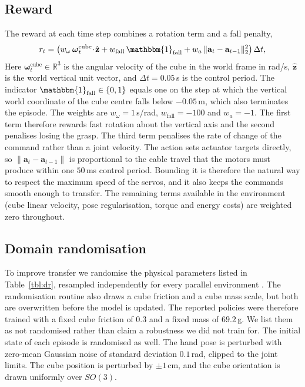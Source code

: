 \documentclass[11pt]{article}
\begin{document}
\subsection{Reward}
The reward at each time step combines a rotation term and a fall penalty,
\begin{equation}
  r_t = \bigl( w_{\omega}\, \boldsymbol{\omega}_t^{\mathrm{cube}} \!\cdot\! \hat{\mathbf{z}}
      + w_{\mathrm{fall}}\, \mathbbm{1}_{\mathrm{fall}}
      + w_{a}\, \lVert \mathbf{a}_t - \mathbf{a}_{t-1} \rVert_2^2 \bigr)\, \Delta t,
  \label{eq:reward}
\end{equation}
Here $\boldsymbol{\omega}_t^{\mathrm{cube}} \in \mathbb{R}^{3}$ is the angular velocity of the cube in the world frame in rad/s, $\hat{\mathbf{z}}$ is the world vertical unit vector, and $\Delta t = 0.05$\,s is the control period.
The indicator $\mathbbm{1}_{\mathrm{fall}} \in \{0,1\}$ equals one on the step at which the vertical world coordinate of the cube centre falls below $-0.05$\,m, which also terminates the episode.
The weights are $w_{\omega} = 1$\,s/rad, $w_{\mathrm{fall}} = -100$ and $w_{a} = -1$.
The first term therefore rewards fast rotation about the vertical axis and the second penalises losing the grasp.
The third term penalises the rate of change of the command rather than a joint velocity.
The action sets actuator targets directly, so $\lVert \mathbf{a}_t - \mathbf{a}_{t-1}\rVert$ is proportional to the cable travel that the motors must produce within one $50$\,ms control period.
Bounding it is therefore the natural way to respect the maximum speed of the servos, and it also keeps the commands smooth enough to transfer.
The remaining terms available in the environment (cube linear velocity, pose regularisation, torque and energy costs) are weighted zero throughout.

\subsection{Domain randomisation}
To improve transfer we randomise the physical parameters listed in Table~\ref{tbl:dr}, resampled independently for every parallel environment \cite{tobin2017domain}.
The randomisation routine also draws a cube friction and a cube mass scale, but both are overwritten before the model is updated.
The reported policies were therefore trained with a fixed cube friction of $0.3$ and a fixed mass of $69.2$\,g.
We list them as not randomised rather than claim a robustness we did not train for.
The initial state of each episode is randomised as well.
The hand pose is perturbed with zero-mean Gaussian noise of standard deviation $0.1$\,rad, clipped to the joint limits.
The cube position is perturbed by $\pm 1$\,cm, and the cube orientation is drawn uniformly over $SO(3)$.
\end{document}
